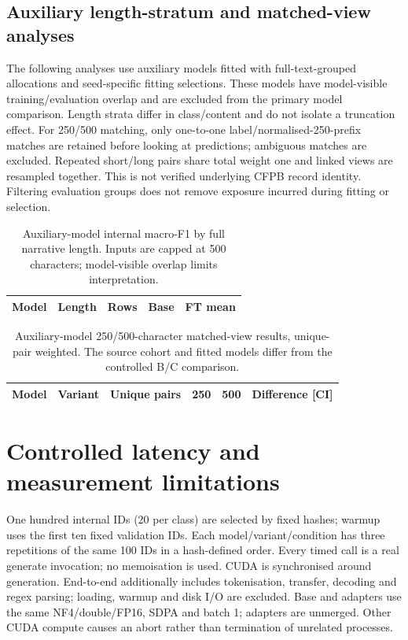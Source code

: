 \documentclass[10pt,a4paper]{article}
\begin{document}
\subsection{Auxiliary length-stratum and matched-view analyses}
The following analyses use auxiliary models fitted with full-text-grouped allocations and seed-specific fitting selections. These models have model-visible training/evaluation overlap and are excluded from the primary model comparison. Length strata differ in class/content and do not isolate a truncation effect. For 250/500 matching, only one-to-one label/normalised-250-prefix matches are retained before looking at predictions; ambiguous matches are excluded. Repeated short/long pairs share total weight one and linked views are resampled together. This is not verified underlying CFPB record identity. Filtering evaluation groups does not remove exposure incurred during fitting or selection.
\begin{table}[H]\centering\small
\caption{Auxiliary-model internal macro-F1 by full narrative length. Inputs are capped at 500 characters; model-visible overlap limits interpretation.}\label{sup:historical-strata}
\begin{tabular}{llrrr}\toprule Model & Length & Rows & Base & FT mean\\\midrule

\end{tabular}\end{table}
\begin{table}[H]\centering\footnotesize
\caption{Auxiliary-model 250/500-character matched-view results, unique-pair weighted. The source cohort and fitted models differ from the controlled B/C comparison.}\label{sup:historical-pairs}
\begin{tabular}{llrrrr}\toprule Model & Variant & Unique pairs & 250 & 500 & Difference [CI]\\\midrule

\end{tabular}\end{table}


\section{Controlled latency and measurement limitations}\label{sup:latency}


One hundred internal IDs (20 per class) are selected by fixed hashes; warmup uses the first ten fixed validation IDs. Each model/variant/condition has three repetitions of the same 100 IDs in a hash-defined order. Every timed call is a real generate invocation; no memoisation is used. CUDA is synchronised around generation. End-to-end additionally includes tokenisation, transfer, decoding and regex parsing; loading, warmup and disk I/O are excluded. Base and adapters use the same NF4/double/FP16, SDPA and batch 1; adapters are unmerged. Other CUDA compute causes an abort rather than termination of unrelated processes.
\end{document}
